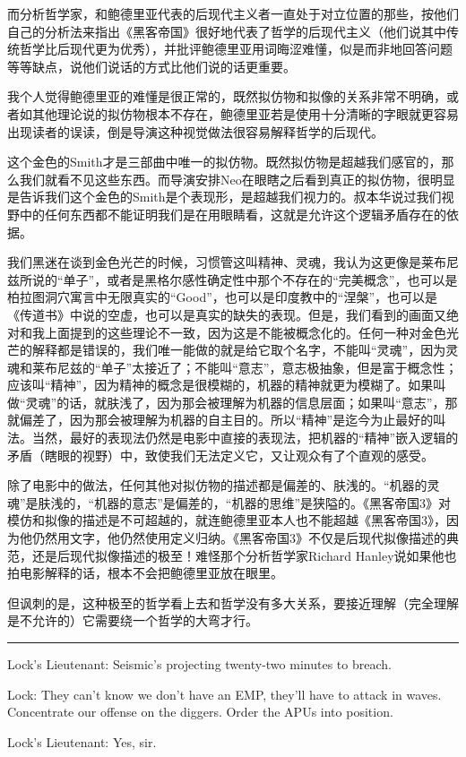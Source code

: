 \documentclass[UTF8]{ctexart}
\newcommand{\myparsep}{\noindent \rule[0.5ex]{\linewidth}{1pt}}
\newenvironment{myquote}{\color{green} \setlength{\leftskip}{6em} \setlength{\rightskip}{4em} \setlength{\parindent}{-2em}}{\par}
\begin{document}
而分析哲学家，和鲍德里亚代表的后现代主义者一直处于对立位置的那些，按他们自己的分析法来指出《黑客帝国》很好地代表了哲学的后现代主义（他们说其中传统哲学比后现代更为优秀），并批评鲍德里亚用词晦涩难懂，似是而非地回答问题等等缺点，说他们说话的方式比他们说的话更重要。

我个人觉得鲍德里亚的难懂是很正常的，既然拟仿物和拟像的关系非常不明确，或者如其他理论说的拟仿物根本不存在，鲍德里亚若是使用十分清晰的字眼就更容易出现读者的误读，倒是导演这种视觉做法很容易解释哲学的后现代。

这个金色的Smith才是三部曲中唯一的拟仿物。既然拟仿物是超越我们感官的，那么我们就看不见这些东西。而导演安排Neo在眼瞎之后看到真正的拟仿物，很明显是告诉我们这个金色的Smith是个表现形，是超越我们视力的。叔本华说过我们视野中的任何东西都不能证明我们是在用眼睛看，这就是允许这个逻辑矛盾存在的依据。

我们黑迷在谈到金色光芒的时候，习惯管这叫精神、灵魂，我认为这更像是莱布尼兹所说的“单子”，或者是黑格尔感性确定性中那个不存在的“完美概念”，也可以是柏拉图洞穴寓言中无限真实的“Good”，也可以是印度教中的“涅槃”，也可以是《传道书》中说的空虚，也可以是真实的缺失的表现。但是，我们看到的画面又绝对和我上面提到的这些理论不一致，因为这是不能被概念化的。任何一种对金色光芒的解释都是错误的，我们唯一能做的就是给它取个名字，不能叫“灵魂”，因为灵魂和莱布尼兹的“单子”太接近了；不能叫“意志”，意志极抽象，但是富于概念性；应该叫“精神”，因为精神的概念是很模糊的，机器的精神就更为模糊了。如果叫做“灵魂”的话，就肤浅了，因为那会被理解为机器的信息层面；如果叫“意志”，那就偏差了，因为那会被理解为机器的自主目的。所以“精神”是迄今为止最好的叫法。当然，最好的表现法仍然是电影中直接的表现法，把机器的“精神”嵌入逻辑的矛盾（瞎眼的视野）中，致使我们无法定义它，又让观众有了个直观的感受。

除了电影中的做法，任何其他对拟仿物的描述都是偏差的、肤浅的。“机器的灵魂”是肤浅的，“机器的意志”是偏差的，“机器的思维”是狭隘的。《黑客帝国3》对模仿和拟像的描述是不可超越的，就连鲍德里亚本人也不能超越《黑客帝国3》，因为他仍然用文字，他仍然使用定义归纳。《黑客帝国3》不仅是后现代拟像描述的典范，还是后现代拟像描述的极至！难怪那个分析哲学家Richard Hanley说如果他也拍电影解释的话，根本不会把鲍德里亚放在眼里。

但讽刺的是，这种极至的哲学看上去和哲学没有多大关系，要接近理解（完全理解是不允许的）它需要绕一个哲学的大弯才行。

\myparsep

\begin{myquote}
Lock's Lieutenant: Seismic's projecting twenty-two minutes to breach.

Lock: They can't know we don't have an EMP, they'll have to attack in waves. Concentrate our offense on the diggers. Order the APUs into position.

Lock's Lieutenant: Yes, sir.
\end{myquote}
\end{document}
